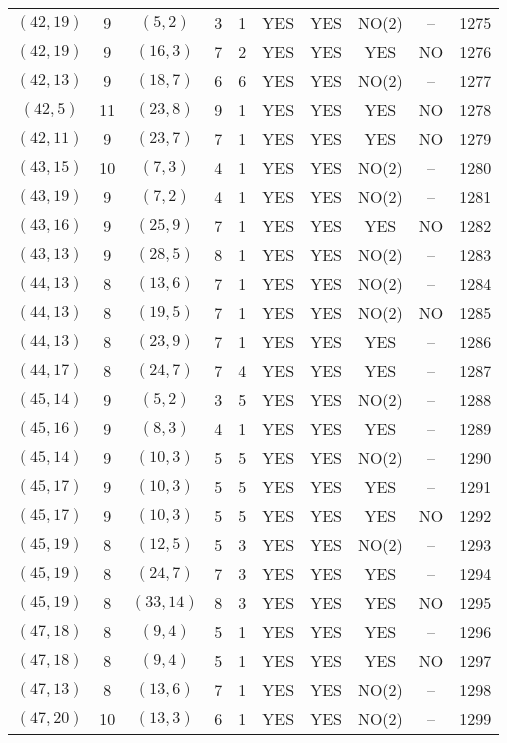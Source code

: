 \begin{longtable}{|c|c|c|c|c|c|c|c|c|c|}
$(42, 19)$ & 9 & $(5, 2)$ & 3 & 1 & YES & YES & NO(2) & -- & 1275\\
$(42, 19)$ & 9 & $(16, 3)$ & 7 & 2 & YES & YES & YES & NO & 1276\\
$(42, 13)$ & 9 & $(18, 7)$ & 6 & 6 & YES & YES & NO(2) & -- & 1277\\
$(42, 5)$ & 11 & $(23, 8)$ & 9 & 1 & YES & YES & YES & NO & 1278\\
$(42, 11)$ & 9 & $(23, 7)$ & 7 & 1 & YES & YES & YES & NO & 1279\\
$(43, 15)$ & 10 & $(7, 3)$ & 4 & 1 & YES & YES & NO(2) & -- & 1280\\
$(43, 19)$ & 9 & $(7, 2)$ & 4 & 1 & YES & YES & NO(2) & -- & 1281\\
$(43, 16)$ & 9 & $(25, 9)$ & 7 & 1 & YES & YES & YES & NO & 1282\\
$(43, 13)$ & 9 & $(28, 5)$ & 8 & 1 & YES & YES & NO(2) & -- & 1283\\
$(44, 13)$ & 8 & $(13, 6)$ & 7 & 1 & YES & YES & NO(2) & -- & 1284\\
$(44, 13)$ & 8 & $(19, 5)$ & 7 & 1 & YES & YES & NO(2) & NO & 1285\\
$(44, 13)$ & 8 & $(23, 9)$ & 7 & 1 & YES & YES & YES & -- & 1286\\
$(44, 17)$ & 8 & $(24, 7)$ & 7 & 4 & YES & YES & YES & -- & 1287\\
$(45, 14)$ & 9 & $(5, 2)$ & 3 & 5 & YES & YES & NO(2) & -- & 1288\\
$(45, 16)$ & 9 & $(8, 3)$ & 4 & 1 & YES & YES & YES & -- & 1289\\
$(45, 14)$ & 9 & $(10, 3)$ & 5 & 5 & YES & YES & NO(2) & -- & 1290\\
$(45, 17)$ & 9 & $(10, 3)$ & 5 & 5 & YES & YES & YES & -- & 1291\\
$(45, 17)$ & 9 & $(10, 3)$ & 5 & 5 & YES & YES & YES & NO & 1292\\
$(45, 19)$ & 8 & $(12, 5)$ & 5 & 3 & YES & YES & NO(2) & -- & 1293\\
$(45, 19)$ & 8 & $(24, 7)$ & 7 & 3 & YES & YES & YES & -- & 1294\\
$(45, 19)$ & 8 & $(33, 14)$ & 8 & 3 & YES & YES & YES & NO & 1295\\
$(47, 18)$ & 8 & $(9, 4)$ & 5 & 1 & YES & YES & YES & -- & 1296\\
$(47, 18)$ & 8 & $(9, 4)$ & 5 & 1 & YES & YES & YES & NO & 1297\\
$(47, 13)$ & 8 & $(13, 6)$ & 7 & 1 & YES & YES & NO(2) & -- & 1298\\
$(47, 20)$ & 10 & $(13, 3)$ & 6 & 1 & YES & YES & NO(2) & -- & 1299\\

\end{longtable}
